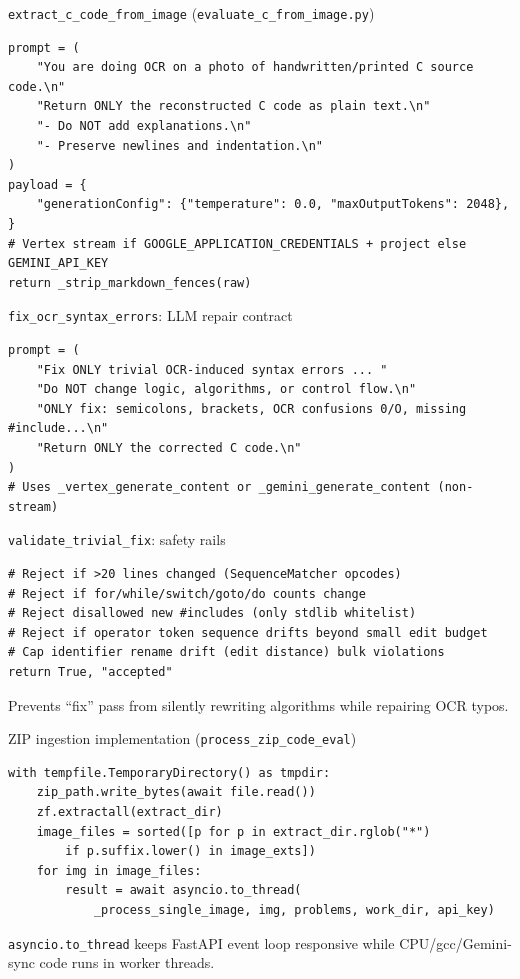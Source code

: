 \documentclass[aspectratio=169]{beamer}
\begin{document}
\begin{frame}[fragile]{\texttt{extract\_c\_code\_from\_image} (\texttt{evaluate\_c\_from\_image.py})}
\begin{lstlisting}[style=py]
prompt = (
    "You are doing OCR on a photo of handwritten/printed C source code.\n"
    "Return ONLY the reconstructed C code as plain text.\n"
    "- Do NOT add explanations.\n"
    "- Preserve newlines and indentation.\n"
)
payload = {
    "generationConfig": {"temperature": 0.0, "maxOutputTokens": 2048},
}
# Vertex stream if GOOGLE_APPLICATION_CREDENTIALS + project else GEMINI_API_KEY
return _strip_markdown_fences(raw)
\end{lstlisting}
\end{frame}

\begin{frame}[fragile]{\texttt{fix\_ocr\_syntax\_errors}: LLM repair contract}
\begin{lstlisting}[style=py]
prompt = (
    "Fix ONLY trivial OCR-induced syntax errors ... "
    "Do NOT change logic, algorithms, or control flow.\n"
    "ONLY fix: semicolons, brackets, OCR confusions 0/O, missing #include...\n"
    "Return ONLY the corrected C code.\n"
)
# Uses _vertex_generate_content or _gemini_generate_content (non-stream)
\end{lstlisting}
\end{frame}

\begin{frame}[fragile]{\texttt{validate\_trivial\_fix}: safety rails}
\begin{lstlisting}[style=py]
# Reject if >20 lines changed (SequenceMatcher opcodes)
# Reject if for/while/switch/goto/do counts change
# Reject disallowed new #includes (only stdlib whitelist)
# Reject if operator token sequence drifts beyond small edit budget
# Cap identifier rename drift (edit distance) bulk violations
return True, "accepted"
\end{lstlisting}
\vfill
\tiny Prevents ``fix'' pass from silently rewriting algorithms while repairing OCR typos.
\end{frame}

\begin{frame}[fragile]{ZIP ingestion implementation (\texttt{process\_zip\_code\_eval})}
\begin{lstlisting}[style=py]
with tempfile.TemporaryDirectory() as tmpdir:
    zip_path.write_bytes(await file.read())
    zf.extractall(extract_dir)
    image_files = sorted([p for p in extract_dir.rglob("*")
        if p.suffix.lower() in image_exts])
    for img in image_files:
        result = await asyncio.to_thread(
            _process_single_image, img, problems, work_dir, api_key)
\end{lstlisting}
\vfill
\tiny \texttt{asyncio.to\_thread} keeps FastAPI event loop responsive while CPU/gcc/Gemini-sync code runs in worker threads.
\end{frame}
\end{document}

